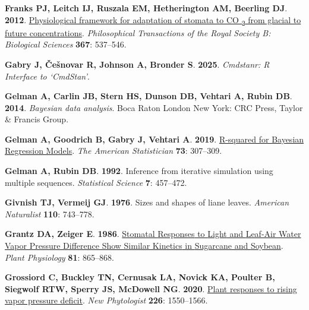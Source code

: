 \documentclass[
  letterpaper,
  DIV=11,
  numbers=noendperiod]{scrartcl}
\newlength{\cslhangindent}
\newenvironment{CSLReferences}[2] %
 {\begin{list}{}{%
  \setlength{\itemindent}{0pt}
  \setlength{\leftmargin}{0pt}
  \setlength{\parsep}{0pt}
  \ifodd #1
   \setlength{\leftmargin}{\cslhangindent}
   \setlength{\itemindent}{-1\cslhangindent}
  \fi
  \setlength{\itemsep}{#2\baselineskip}}}
 {\end{list}}
\begin{document}
\begin{CSLReferences}{0}{1}
\textbf{\textbf{Franks PJ}, \textbf{Leitch IJ}, \textbf{Ruszala EM},
\textbf{Hetherington AM}, \textbf{Beerling DJ}}. \textbf{2012}.
\href{https://doi.org/10.1098/rstb.2011.0270}{Physiological framework
for adaptation of stomata to {CO} {\textsubscript{2}} from glacial to
future concentrations}. \emph{Philosophical Transactions of the Royal
Society B: Biological Sciences} \textbf{367}: 537--546.

\textbf{\textbf{Gabry J}, \textbf{Češnovar R}, \textbf{Johnson A},
\textbf{Bronder S}}. \textbf{2025}. \emph{Cmdstanr: {R Interface} to
{`{CmdStan}'}}.

\textbf{\textbf{Gelman A}, \textbf{Carlin JB}, \textbf{Stern HS},
\textbf{Dunson DB}, \textbf{Vehtari A}, \textbf{Rubin DB}}.
\textbf{2014}. \emph{Bayesian data analysis}. Boca Raton London New
York: CRC Press, Taylor \& Francis Group.

\textbf{\textbf{Gelman A}, \textbf{Goodrich B}, \textbf{Gabry J},
\textbf{Vehtari A}}. \textbf{2019}.
\href{https://doi.org/10.1080/00031305.2018.1549100}{R-squared for
{Bayesian Regression Models}}. \emph{The American Statistician}
\textbf{73}: 307--309.

\textbf{\textbf{Gelman A}, \textbf{Rubin DB}}. \textbf{1992}. Inference
from iterative simulation using multiple sequences. \emph{Statistical
Science} \textbf{7}: 457--472.

\textbf{\textbf{Givnish TJ}, \textbf{Vermeij GJ}}. \textbf{1976}. Sizes
and shapes of liane leaves. \emph{American Naturalist} \textbf{110}:
743--778.

\textbf{\textbf{Grantz DA}, \textbf{Zeiger E}}. \textbf{1986}.
\href{https://doi.org/10.1104/pp.81.3.865}{Stomatal {Responses} to
{Light} and {Leaf-Air Water Vapor Pressure Difference Show Similar
Kinetics} in {Sugarcane} and {Soybean}}. \emph{Plant Physiology}
\textbf{81}: 865--868.

\textbf{\textbf{Grossiord C}, \textbf{Buckley TN}, \textbf{Cernusak LA},
\textbf{Novick KA}, \textbf{Poulter B}, \textbf{Siegwolf RTW},
\textbf{Sperry JS}, \textbf{McDowell NG}}. \textbf{2020}.
\href{https://doi.org/10.1111/nph.16485}{Plant responses to rising vapor
pressure deficit}. \emph{New Phytologist} \textbf{226}: 1550--1566.


\end{CSLReferences}
\end{document}
